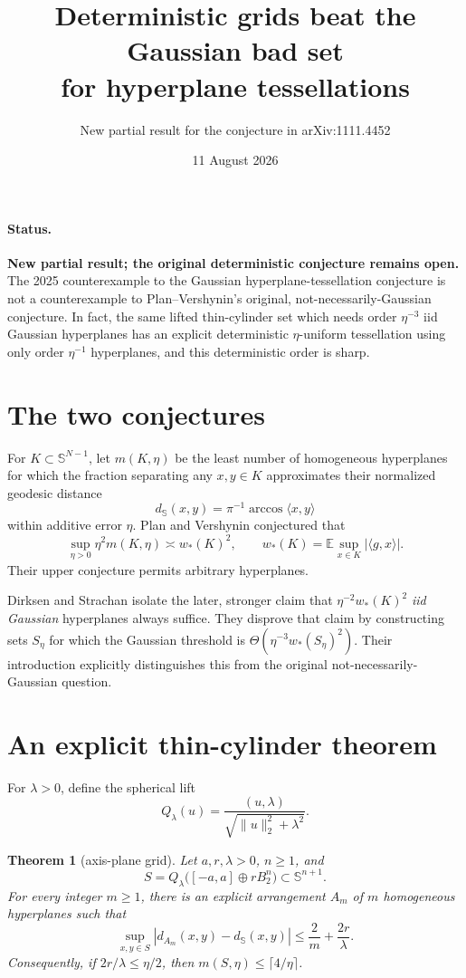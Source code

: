 \documentclass[11pt]{article}
\title{Deterministic grids beat the Gaussian bad set\\
for hyperplane tessellations}
\author{New partial result for the conjecture in arXiv:1111.4452}
\date{11 August 2026}
\newtheorem{theorem}{Theorem}
\newcommand{\Sph}{\mathbb S}
\begin{document}
\maketitle

\paragraph{Status.}
\textbf{New partial result; the original deterministic conjecture remains
open.}
The 2025 counterexample to the Gaussian hyperplane-tessellation conjecture is
not a counterexample to Plan--Vershynin's original, not-necessarily-Gaussian
conjecture.  In fact, the same lifted thin-cylinder set which needs order
\(\eta^{-3}\) iid Gaussian hyperplanes has an explicit deterministic
\(\eta\)-uniform tessellation using only order \(\eta^{-1}\) hyperplanes, and
this deterministic order is sharp.

\section*{The two conjectures}
For \(K\subset\Sph^{N-1}\), let \(m(K,\eta)\) be the least number of
homogeneous hyperplanes for which the fraction separating any \(x,y\in K\)
approximates their normalized geodesic distance
\[
 d_{\Sph}(x,y)=\pi^{-1}\arccos\langle x,y\rangle
\]
within additive error \(\eta\).  Plan and Vershynin \cite{pv} conjectured that
\[
 \sup_{\eta>0}\eta^2m(K,\eta)\asymp w_*(K)^2,
 \qquad
 w_*(K)=\mathbb E\sup_{x\in K}|\langle g,x\rangle|.
\]
Their upper conjecture permits arbitrary hyperplanes.

Dirksen and Strachan \cite{ds} isolate the later, stronger claim that
\(\eta^{-2}w_*(K)^2\) \emph{iid Gaussian} hyperplanes always suffice.  They
disprove that claim by constructing sets \(S_\eta\) for which the Gaussian
threshold is \(\Theta(\eta^{-3}w_*(S_\eta)^2)\).  Their introduction
explicitly distinguishes this from the original not-necessarily-Gaussian
question.

\section*{An explicit thin-cylinder theorem}
For \(\lambda>0\), define the spherical lift
\[
 Q_\lambda(u)=\frac{(u,\lambda)}
 {\sqrt{\|u\|_2^2+\lambda^2}}.
\]

\begin{theorem}[axis-plane grid]\label{thm:grid}
Let \(a,r,\lambda>0\), \(n\ge1\), and
\[
 S=Q_\lambda\bigl([-a,a]\oplus rB_2^n\bigr)
 \subset\Sph^{n+1}.
\]
For every integer \(m\ge1\), there is an explicit arrangement \(A_m\) of
\(m\) homogeneous hyperplanes such that
\[
 \sup_{x,y\in S}|d_{A_m}(x,y)-d_{\Sph}(x,y)|
 \le \frac{2}{m}+\frac{2r}{\lambda}.
\]
Consequently, if \(2r/\lambda\le\eta/2\), then
\(m(S,\eta)\le\lceil4/\eta\rceil\).
\end{theorem}
\end{document}
